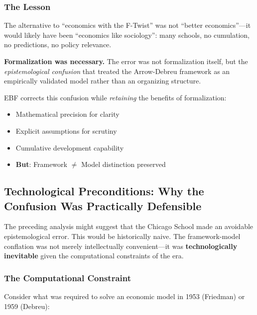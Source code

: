 \subsubsection{The Lesson}

The alternative to ``economics with the F-Twist'' was not ``better economics''---it
would likely have been ``economics like sociology'': many schools, no cumulation,
no predictions, no policy relevance.

\textbf{Formalization was necessary.} The error was not formalization itself,
but the \textit{epistemological confusion} that treated the Arrow-Debreu framework
as an empirically validated model rather than an organizing structure.

EBF corrects this confusion while \textit{retaining} the benefits of formalization:
\begin{itemize}[nosep]
    \item Mathematical precision for clarity
    \item Explicit assumptions for scrutiny
    \item Cumulative development capability
    \item \textbf{But}: Framework $\neq$ Model distinction preserved
\end{itemize}



\subsection{Technological Preconditions: Why the Confusion Was Practically Defensible}
\label{sec:meta-technology}

The preceding analysis might suggest that the Chicago School made an avoidable
epistemological error. This would be historically naive. The framework-model
conflation was not merely intellectually convenient---it was \textbf{technologically
inevitable} given the computational constraints of the era.

\subsubsection{The Computational Constraint}

Consider what was required to solve an economic model in 1953 (Friedman) or
1959 (Debreu):


